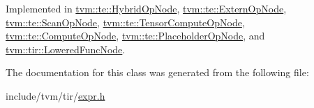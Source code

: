 Implemented in \hyperlink{classtvm_1_1te_1_1HybridOpNode_aa0ad4d918a2da7686be57ffacaff971c}{tvm\+::te\+::\+Hybrid\+Op\+Node}, \hyperlink{classtvm_1_1te_1_1ExternOpNode_a1a0ce8401e57d9c66ece44dd59b3fb7d}{tvm\+::te\+::\+Extern\+Op\+Node}, \hyperlink{classtvm_1_1te_1_1ScanOpNode_a1c3059f01aa644a41a6fbfec16538d1e}{tvm\+::te\+::\+Scan\+Op\+Node}, \hyperlink{classtvm_1_1te_1_1TensorComputeOpNode_afccdc3ad7b735d87f93dfecfc6f4021b}{tvm\+::te\+::\+Tensor\+Compute\+Op\+Node}, \hyperlink{classtvm_1_1te_1_1ComputeOpNode_ac4b034b11601367864722954c1b7c7fe}{tvm\+::te\+::\+Compute\+Op\+Node}, \hyperlink{classtvm_1_1te_1_1PlaceholderOpNode_a777ce9b0843eaaa37d0667b14d50059a}{tvm\+::te\+::\+Placeholder\+Op\+Node}, and \hyperlink{classtvm_1_1tir_1_1LoweredFuncNode_a00ac40b83b414dfa2af245f7a5117d38}{tvm\+::tir\+::\+Lowered\+Func\+Node}.



The documentation for this class was generated from the following file\+:\begin{DoxyCompactItemize}
\item 
include/tvm/tir/\hyperlink{tir_2expr_8h}{expr.\+h}\end{DoxyCompactItemize}
